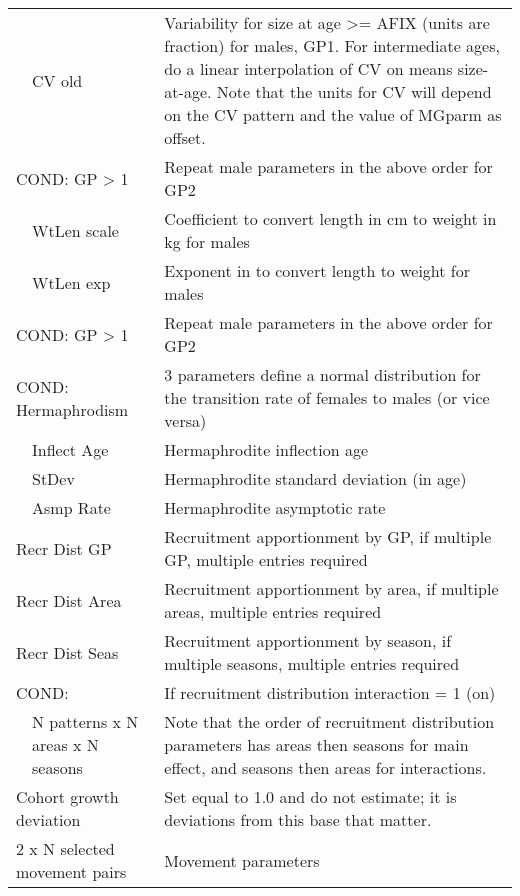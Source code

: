 \begin{center}
\begin{longtable}{p{1cm} p{2.5cm} p{10cm}}
		& CV old &  Variability for size at age >= AFIX (units are fraction) for males, GP1. For intermediate ages, do a linear interpolation of CV on means size-at-age.  Note that the units for CV will depend on the CV pattern and the value of MGparm as offset.\\
		\multicolumn{2}{l}{COND: GP > 1} & Repeat male parameters in the above order for GP2\\
		\hline
		& WtLen scale & Coefficient to convert length in cm to weight in kg for males\\
	    & WtLen exp & Exponent in to convert length to weight for males\\
		\hline
		\multicolumn{2}{l}{COND: GP > 1} & Repeat male parameters in the above order for GP2\\
		\hline
		\multicolumn{2}{l}{COND: Hermaphrodism} & 3 parameters define a normal distribution for the transition rate of females to males (or vice versa)\\
		& Inflect Age & Hermaphrodite inflection age\\
		& StDev & Hermaphrodite standard deviation (in age) \\
		& Asmp Rate & Hermaphrodite asymptotic rate\\
		\hline
		\multicolumn{2}{l}{Recr Dist GP} & Recruitment apportionment by GP, if multiple GP, multiple entries required\\
		\multicolumn{2}{l}{Recr Dist Area} & Recruitment apportionment by area, if multiple areas, multiple entries required\\
		\multicolumn{2}{l}{Recr Dist Seas} & Recruitment apportionment by season, if multiple seasons, multiple entries required\\
		\hline
		\multicolumn{2}{l}{COND:} & If recruitment distribution interaction = 1 (on)\\
		& N patterns x N areas x N seasons & Note that the order of recruitment distribution parameters has areas then seasons for main effect, and seasons then areas for interactions.\\
		\hline
		\multicolumn{2}{l}{Cohort growth deviation} & Set equal to 1.0 and do not estimate; it is deviations from this base that matter.\\
		\hline
		\multicolumn{2}{l}{2 x N selected movement pairs} & Movement parameters\\

\end{longtable}
\end{center}
